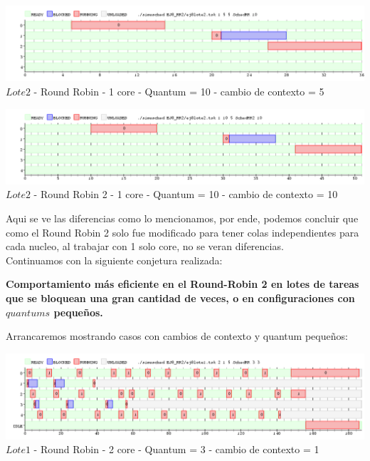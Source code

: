  \begin{center}
    	\includegraphics[width=450pt]{./EJ8_RR2/dif3corerr.png}
	{$Lote 2$ - Round Robin - 1 core - Quantum = 10 - cambio de contexto = 5}	
 \end{center}
 
 \begin{center}
    	\includegraphics[width=450pt]{./EJ8_RR2/dif3corerr2.png}
	{$Lote 2$ - Round Robin 2 - 1 core - Quantum = 10 - cambio de contexto = 10}	
 \end{center}
 
  \indent Aqui se ve las diferencias como lo mencionamos, por ende, podemos concluir que como el Round Robin 2 solo fue modificado 
  para tener colas independientes para cada nucleo, al trabajar con 1 solo core, no se veran diferencias.\\

  \indent Continuamos con la siguiente conjetura realizada:
  
  \begin{center}
   \textbf{Comportamiento más eficiente en el Round-Robin 2 en lotes de tareas que se bloquean una gran cantidad de veces, 
   o  en configuraciones con $quantums$ pequeños.}
  \end{center}
  
  \indent Arrancaremos mostrando casos con cambios de contexto y quantum pequeños:
  
   \begin{center}
    	\includegraphics[width=450pt]{./EJ8_RR2/dif4corerr.png}
	{$Lote 1$ - Round Robin - 2 core - Quantum = 3 - cambio de contexto = 1}	
 \end{center}
 
